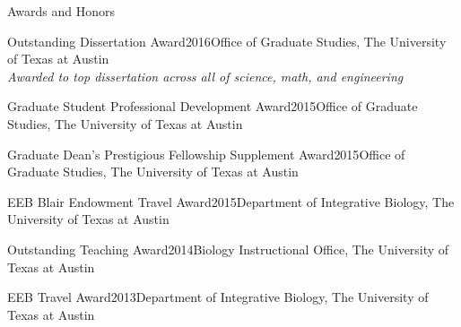 \documentclass{resume} %
\begin{document}

\vspace*{0.35cm}
\begin{rSection}{Awards and Honors}
\vspace*{0.25cm}


\begin{rSubsection}{President's Award for Excellence in Innovative Instructional Delivery}{2021}{Faculty Center for Teaching Excellence, Rowan University}}}{}
\end{rSubsection}

\begin{rSubsection}{Outstanding Dissertation Award}{2016}{Office of Graduate Studies, The University of Texas at Austin \\ \emph{\footnotesize{Awarded to top dissertation across all of science, math, and engineering}}}{}
\end{rSubsection}

\begin{rSubsection}{Graduate Student Professional Development Award}{2015}{Office of Graduate Studies, The University of Texas at Austin}{}
\end{rSubsection}

\begin{rSubsection}{Graduate Dean's Prestigious Fellowship Supplement Award}{2015}{Office of Graduate Studies, The University of Texas at Austin}{}
\end{rSubsection}

\begin{rSubsection}{EEB Blair Endowment Travel Award}{2015}{Department of Integrative Biology, The University of Texas at Austin}{}
\end{rSubsection}

\begin{rSubsection}{Outstanding Teaching Award}{2014}{Biology Instructional Office, The University of Texas at Austin}{}
\end{rSubsection}

\begin{rSubsection}{EEB Travel Award}{2013}{Department of Integrative Biology, The University of Texas at Austin}{}
\end{rSubsection}


\end{rSection}
\end{document}
